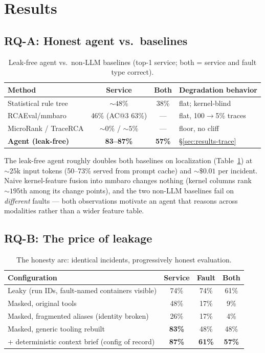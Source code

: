 \section{Results}
\label{sec:results}

\subsection{RQ-A: Honest agent vs.\ baselines}
\label{sec:results-baselines}

\begin{table}[t]
\caption{Leak-free agent vs.\ non-LLM baselines (top-1 service; both = service and
fault type correct).}
\label{tab:baselines}
\begin{tabular}{lccl}
\toprule
Method & Service & Both & Degradation behavior \\
\midrule
Statistical rule tree & ${\sim}48\%$ & 38\% & flat; kernel-blind \\
RCAEval/mmbaro & 46\% (AC@3 63\%) & --- & flat, 100$\to$5\% traces \\
MicroRank / TraceRCA & ${\sim}0\%$ / ${\sim}5\%$ & --- & floor, no cliff \\
\textbf{Agent (leak-free)} & \textbf{83--87\%} & \textbf{57\%} & \S\ref{sec:results-trace} \\
\bottomrule
\end{tabular}
\end{table}

The leak-free agent roughly doubles both baselines on localization
(Table~\ref{tab:baselines}) at ${\sim}25$k input tokens (50--73\% served from prompt
cache) and ${\sim}\$0.01$ per incident. Naive kernel-feature fusion into mmbaro changes
nothing (kernel columns rank ${\sim}195$th among its change points), and the two
non-LLM baselines fail on \emph{different} faults --- both observations motivate an
agent that reasons across modalities rather than a wider feature table.

\subsection{RQ-B: The price of leakage}
\label{sec:results-leak}

\begin{table}[t]
\caption{The honesty arc: identical incidents, progressively honest evaluation.}
\label{tab:leak}
\begin{tabular}{lccc}
\toprule
Configuration & Service & Fault & Both \\
\midrule
Leaky (run IDs, fault-named containers visible) & 74\% & 74\% & 61\% \\
Masked, original tools & 48\% & 17\% & 9\% \\
Masked, fragmented aliases (identity broken) & 26\% & 17\% & 4\% \\
Masked, generic tooling rebuilt & \textbf{83\%} & 48\% & 48\% \\
\quad + deterministic context brief (config of record) & \textbf{87\%} & \textbf{61\%} & \textbf{57\%} \\
\bottomrule
\end{tabular}
\end{table}

